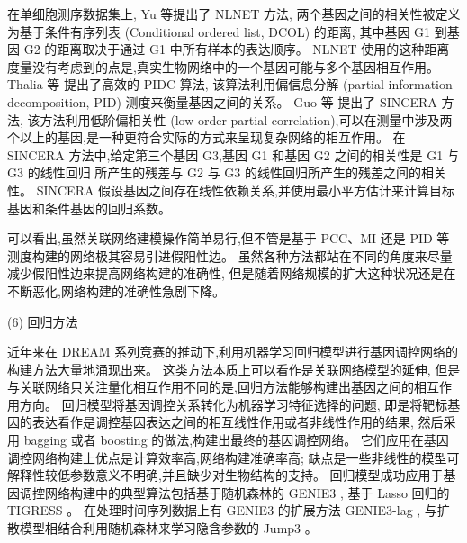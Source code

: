 在单细胞测序数据集上,
Yu 等提出了 NLNET 方法, 
两个基因之间的相关性被定义为基于条件有序列表 (Conditional ordered list, DCOL) 的距离,
其中基因 G1 到基因 G2 的距离取决于通过 G1 中所有样本的表达顺序。
NLNET 使用的这种距离度量没有考虑到的点是,真实生物网络中的一个基因可能与多个基因相互作用。
Thalia 等  提出了高效的 PIDC 算法,
该算法利用偏信息分解 (partial information decomposition, PID) 测度来衡量基因之间的关系。
Guo 等  提出了 SINCERA 方法, 该方法利用低阶偏相关性 (low-order partial correlation),可以在测量中涉及两个以上的基因,是一种更符合实际的方式来呈现复杂网络的相互作用。
在 SINCERA 方法中,给定第三个基因 G3,基因 G1 和基因 G2 之间的相关性是 G1 与 G3 的线性回归
所产生的残差与 G2 与 G3 的线性回归所产生的残差之间的相关性。
SINCERA 假设基因之间存在线性依赖关系,并使用最小平方估计来计算目标基因和条件基因的回归系数。

可以看出,虽然关联网络建模操作简单易行,但不管是基于 PCC、MI 还是 PID 等测度构建的网络极其容易引进假阳性边。
虽然各种方法都站在不同的角度来尽量减少假阳性边来提高网络构建的准确性,
但是随着网络规模的扩大这种状况还是在不断恶化,网络构建的准确性急剧下降。

(6) 回归方法

近年来在 DREAM 系列竞赛的推动下,利用机器学习回归模型进行基因调控网络的构建方法大量地涌现出来。
这类方法本质上可以看作是关联网络模型的延伸,
但是与关联网络只关注量化相互作用不同的是,回归方法能够构建出基因之间的相互作用方向。
回归模型将基因调控关系转化为机器学习特征选择的问题,
即是将靶标基因的表达看作是调控基因表达之间的相互线性作用或者非线性作用的结果,
然后采用 bagging 或者 boosting 的做法,构建出最终的基因调控网络。
它们应用在基因调控网络构建上优点是计算效率高,网络构建准确率高;
缺点是一些非线性的模型可解释性较低参数意义不明确,并且缺少对生物结构的支持。
回归模型成功应用于基因调控网络构建中的典型算法包括基于随机森林的 GENIE3 ,
基于 Lasso 回归的 TIGRESS 。
在处理时间序列数据上有 GENIE3 的扩展方法 GENIE3-lag ,
与扩散模型相结合利用随机森林来学习隐含参数的 Jump3 。

